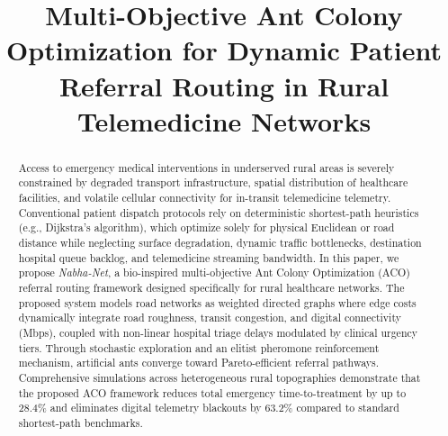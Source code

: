 \documentclass[conference]{IEEEtran}
\begin{document}
\title{Multi-Objective Ant Colony Optimization for Dynamic Patient Referral Routing in Rural Telemedicine Networks}

\author{
\and
{}
\and
{}
}

\maketitle

\begin{abstract}
Access to emergency medical interventions in underserved rural areas is severely constrained by degraded transport infrastructure, spatial distribution of healthcare facilities, and volatile cellular connectivity for in-transit telemedicine telemetry. Conventional patient dispatch protocols rely on deterministic shortest-path heuristics (e.g., Dijkstra's algorithm), which optimize solely for physical Euclidean or road distance while neglecting surface degradation, dynamic traffic bottlenecks, destination hospital queue backlog, and telemedicine streaming bandwidth. In this paper, we propose \textit{Nabha-Net}, a bio-inspired multi-objective Ant Colony Optimization (ACO) referral routing framework designed specifically for rural healthcare networks. The proposed system models road networks as weighted directed graphs where edge costs dynamically integrate road roughness, transit congestion, and digital connectivity (Mbps), coupled with non-linear hospital triage delays modulated by clinical urgency tiers. Through stochastic exploration and an elitist pheromone reinforcement mechanism, artificial ants converge toward Pareto-efficient referral pathways. Comprehensive simulations across heterogeneous rural topographies demonstrate that the proposed ACO framework reduces total emergency time-to-treatment by up to 28.4\% and eliminates digital telemetry blackouts by 63.2\% compared to standard shortest-path benchmarks.
\end{abstract}
\end{document}
